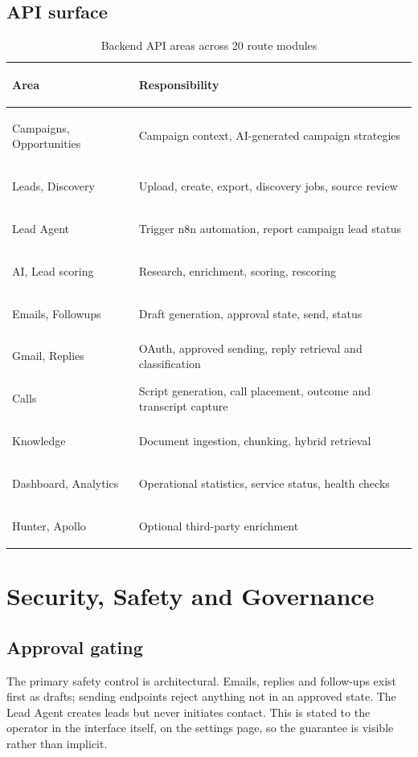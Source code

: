 \documentclass[11pt,a4paper]{report}
\begin{document}
\section{API surface}
\begin{table}[H]
\centering
\caption{Backend API areas across 20 route modules}
\small
\begin{tabularx}{\textwidth}{>{\bfseries\raggedright\arraybackslash}p{4.2cm} X}
\toprule
Area & Responsibility \\
\midrule
Campaigns, Opportunities & Campaign context, AI-generated campaign strategies \\
Leads, Discovery & Upload, create, export, discovery jobs, source review \\
Lead Agent & Trigger n8n automation, report campaign lead status \\
AI, Lead scoring & Research, enrichment, scoring, rescoring \\
Emails, Followups & Draft generation, approval state, send, status \\
Gmail, Replies & OAuth, approved sending, reply retrieval and classification \\
Calls & Script generation, call placement, outcome and transcript capture \\
Knowledge & Document ingestion, chunking, hybrid retrieval \\
Dashboard, Analytics & Operational statistics, service status, health checks \\
Hunter, Apollo & Optional third-party enrichment \\
\bottomrule
\end{tabularx}
\end{table}

\chapter{Security, Safety and Governance}
\section{Approval gating}
The primary safety control is architectural. Emails, replies and follow-ups exist first as drafts; sending endpoints reject anything not in an approved state. The Lead Agent creates leads but never initiates contact. This is stated to the operator in the interface itself, on the settings page, so the guarantee is visible rather than implicit.
\end{document}
